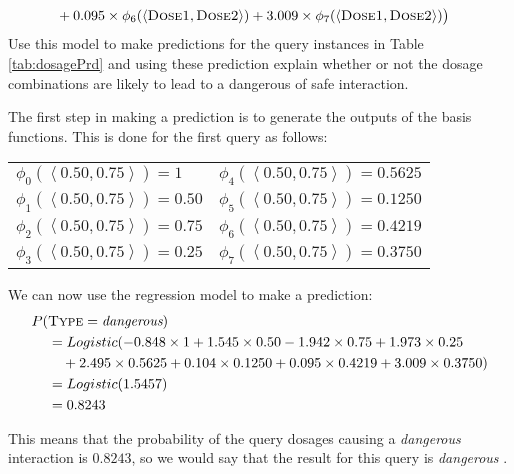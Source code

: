 \documentclass[--SOLUTION-OPTION--]{ditpaper}
\begin{document}
\begin{enumerate}
\begin{alignat*}{2}
  & + 0.095 \times\phi_6(\mathbf{\left<\textsc{Dose1}, \textsc{Dose2}\right>})
  + 3.009\times\phi_7(\mathbf{\left<\textsc{Dose1}, \textsc{Dose2}\right>})\big) 
\end{alignat*}
Use this model to make predictions for the query instances in Table \ref{tab:dosagePrd} and using these prediction explain whether or not the dosage combinations are likely to lead to a dangerous of safe interaction.
		\begin{answer}
	The first step in making a prediction is to generate the outputs of the basis functions. This is done for the first query as follows:
			\begin{center}
\begin{tabular}[ht]{ l  l  }
$\phi_0(\left<0.50, 0.75\right>) =  1$ & $\phi_4(\left<0.50, 0.75\right>) = 0.5625$ \\
$\phi_1(\left<0.50, 0.75\right>) = 0.50$ & $\phi_5(\left<0.50, 0.75\right>) = 0.1250$ \\
$\phi_2(\left<0.50, 0.75\right>) = 0.75$ &$\phi_6(\left<0.50, 0.75\right>) = 0.4219$  \\
$\phi_3(\left<0.50, 0.75\right>) = 0.25$ & $\phi_7(\left<0.50, 0.75\right>) = 0.3750$ \\
\end{tabular}
\end{center}
	We can now use the regression model to make a prediction:
		\begin{alignat*}{2}				
P(&\textsc{Type}=\textit{dangerous}) \\
& = Logistic(-0.848\times 1 + 1.545 \times0.50 -1.942 \times0.75 + 1.973 \times0.25 \\
& ~~~ +  2.495   \times 0.5625 + 0.104 \times 0.1250 + 0.095 \times 0.4219 + 3.009\times0.3750) \\
 & = Logistic(1.5457)  \\
 & = 0.8243 
\end{alignat*}

\noindent This means that the probability of the query dosages causing a \textit{dangerous} interaction is $0.8243$, so we would say that the result for this query is  \textit{dangerous} . 


\end{answer}
\end{enumerate}
\end{document}
